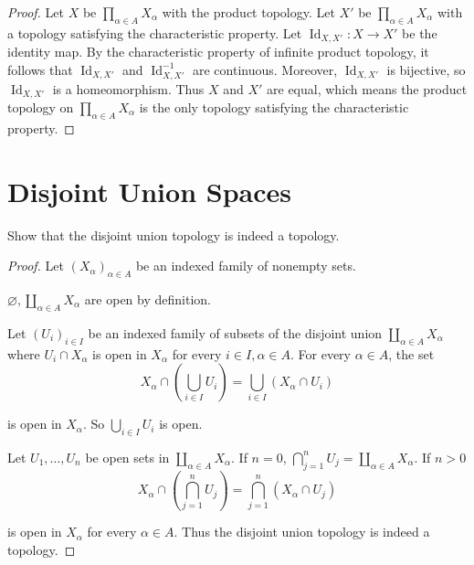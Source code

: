 \begin{proof}
    \bigskip
    Let $X$ be $\prod_{\alpha\in A}X_{\alpha}$ with the product topology. Let $X'$ be $\prod_{\alpha\in A}X_{\alpha}$ with a topology satisfying the characteristic property. Let $\operatorname{Id}_{X,X'}: X\to X'$ be the identity map. By the characteristic property of infinite product topology, it follows that $\operatorname{Id}_{X,X'}$ and $\operatorname{Id}_{X,X'}^{-1}$ are continuous. Moreover, $\operatorname{Id}_{X,X'}$ is bijective, so $\operatorname{Id}_{X,X'}$ is a homeomorphism. Thus $X$ and $X'$ are equal, which means the product topology on $\prod_{\alpha\in A}X_{\alpha}$ is the only topology satisfying the characteristic property.
\end{proof}

\section*{Disjoint Union Spaces}

\begin{exercise}{3.40}
    Show that the disjoint union topology is indeed a topology.
\end{exercise}

\begin{proof}
    Let ${(X_{\alpha})}_{\alpha\in A}$ be an indexed family of nonempty sets.

    $\varnothing, \coprod_{\alpha\in A}X_{\alpha}$ are open by definition.

    Let ${(U_{i})}_{i\in I}$ be an indexed family of subsets of the disjoint union $\coprod_{\alpha\in A}X_{\alpha}$ where $U_{i}\cap X_{\alpha}$ is open in $X_{\alpha}$ for every $i\in I, \alpha\in A$. For every $\alpha\in A$, the set
    \[
        X_{\alpha}\cap \left(\bigcup_{i\in I}U_{i}\right) = \bigcup_{i\in I}(X_{\alpha}\cap U_{i})
    \]

    is open in $X_{\alpha}$. So $\bigcup_{i\in I}U_{i}$ is open.

    Let $U_{1}, \ldots, U_{n}$ be open sets in $\coprod_{\alpha\in A}X_{\alpha}$. If $n = 0$, $\bigcap^{n}_{j=1}U_{j} = \coprod_{\alpha\in A}X_{\alpha}$. If $n > 0$
    \[
        X_{\alpha}\cap \left(\bigcap^{n}_{j=1}U_{j}\right) = \bigcap^{n}_{j=1}(X_{\alpha}\cap U_{j})
    \]

    is open in $X_{\alpha}$ for every $\alpha\in A$. Thus the disjoint union topology is indeed a topology.
\end{proof}

